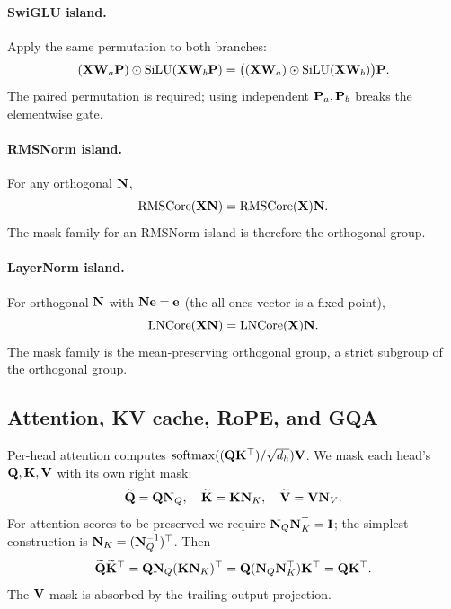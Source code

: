\paragraph{SwiGLU island.} Apply the same permutation to both branches:
\begin{equation}
(\mathbf{X}\mathbf{W}_a\mathbf{P})\odot\mathrm{SiLU}(\mathbf{X}\mathbf{W}_b\mathbf{P}) = \big((\mathbf{X}\mathbf{W}_a)\odot\mathrm{SiLU}(\mathbf{X}\mathbf{W}_b)\big)\mathbf{P}.
\end{equation}
The paired permutation is required; using independent $\mathbf{P}_a, \mathbf{P}_b$ breaks the elementwise gate.

\paragraph{RMSNorm island.} For any orthogonal $\mathbf{N}$,
\begin{equation}
\mathrm{RMSCore}(\mathbf{X}\mathbf{N}) = \mathrm{RMSCore}(\mathbf{X})\mathbf{N}.
\end{equation}
The mask family for an RMSNorm island is therefore the orthogonal group.

\paragraph{LayerNorm island.} For orthogonal $\mathbf{N}$ with $\mathbf{N}\mathbf{e} = \mathbf{e}$ (the all-ones vector is a fixed point),
\begin{equation}
\mathrm{LNCore}(\mathbf{X}\mathbf{N}) = \mathrm{LNCore}(\mathbf{X})\mathbf{N}.
\end{equation}
The mask family is the mean-preserving orthogonal group, a strict subgroup of the orthogonal group.



\subsection{Attention, KV cache, RoPE, and GQA}
\label{sec:design:attention}
Per-head attention computes $\mathrm{softmax}((\mathbf{Q}\mathbf{K}^{\top})/\sqrt{d_h})\mathbf{V}$. We mask each head's $\mathbf{Q}, \mathbf{K}, \mathbf{V}$ with its own right mask:
\begin{equation}
\widetilde{\mathbf{Q}} = \mathbf{Q}\mathbf{N}_{Q}, \quad \widetilde{\mathbf{K}} = \mathbf{K}\mathbf{N}_{K}, \quad \widetilde{\mathbf{V}} = \mathbf{V}\mathbf{N}_{V}.
\end{equation}
For attention scores to be preserved we require $\mathbf{N}_{Q}\mathbf{N}_{K}^{\top} = \mathbf{I}$; the simplest construction is $\mathbf{N}_{K} = (\mathbf{N}_{Q}^{-1})^{\top}$. Then
\begin{equation}
\widetilde{\mathbf{Q}}\widetilde{\mathbf{K}}^{\top} = \mathbf{Q}\mathbf{N}_{Q}(\mathbf{K}\mathbf{N}_{K})^{\top} = \mathbf{Q}(\mathbf{N}_{Q}\mathbf{N}_{K}^{\top})\mathbf{K}^{\top} = \mathbf{Q}\mathbf{K}^{\top}.
\end{equation}
The $\mathbf{V}$ mask is absorbed by the trailing output projection.

